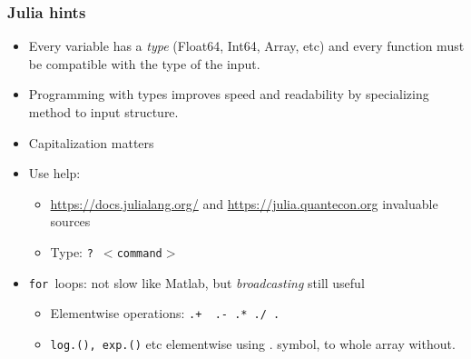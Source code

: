 \documentclass[bigger]{beamer}
\let\TEXTsymbol\ensuremath
\begin{document}
\begin{frame}%

\frametitle{Julia hints}

\begin{itemize}
\item Every variable has a \emph{type} (Float64, Int64, Array, etc) and every function must be compatible with the type of the input.

\item Programming with types improves speed and readability by specializing method to input structure.

\item Capitalization matters

\item Use help:

\begin{itemize}

\item \url{https://docs.julialang.org/} and \url{https://julia.quantecon.org} invaluable sources

\item Type: \texttt{? \TEXTsymbol{<}command\TEXTsymbol{>}}
\end{itemize}

\item \texttt{for }loops: not slow like Matlab, but \emph{broadcasting} still useful

\begin{itemize}
\item Elementwise operations: \texttt{.+ \ .- .* ./ .}

\item \texttt{log.(), exp.()} etc elementwise using $.$ symbol, to whole array without.
\end{itemize}
\end{itemize}


\end{frame}
\end{document}
